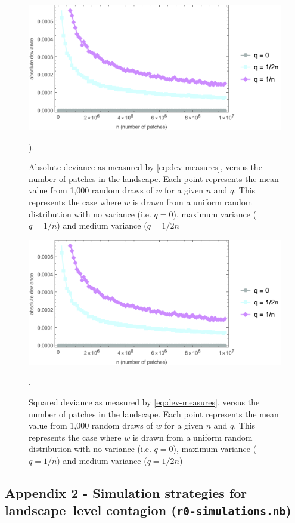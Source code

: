 \begin{figure}[!hpt]
    \centering
    \includegraphics[width=0.8\linewidth]{figs/si/patch-weight-convergence/absPlotAll.png}
    \caption{Absolute deviance as measured by \cref{eq:dev-measures}, versus the number of patches in the landscape. Each point represents the mean value from 1,000 random draws of $w$ for a given $n$ and $q$. This represents the case where $w$ is drawn from a uniform random distribution with no variance (i.e. $q=0$), maximum variance ($q=1/n$) and medium variance ($q=1/2n$}). 
    \label{fig:patch-weight-abs}
\end{figure}
\begin{figure}[!hpt]
    \centering
    \includegraphics[width=0.8\linewidth]{figs/si/patch-weight-convergence/absPlotAll.png}
    \caption{Squared deviance as measured by \cref{eq:dev-measures}, versus the number of patches in the landscape. Each point represents the mean value from 1,000 random draws of $w$ for a given $n$ and $q$. This represents the case where $w$ is drawn from a uniform random distribution with no variance (i.e. $q=0$), maximum variance ($q=1/n$) and medium variance ($q=1/2n$)}. 
    \label{fig:patch-weight-sq}
\end{figure}
\newpage

\subsection*{Appendix 2 - Simulation strategies for landscape--level contagion (\texttt{\color{blue}r0-simulations.nb})}\label{app:app-2}

